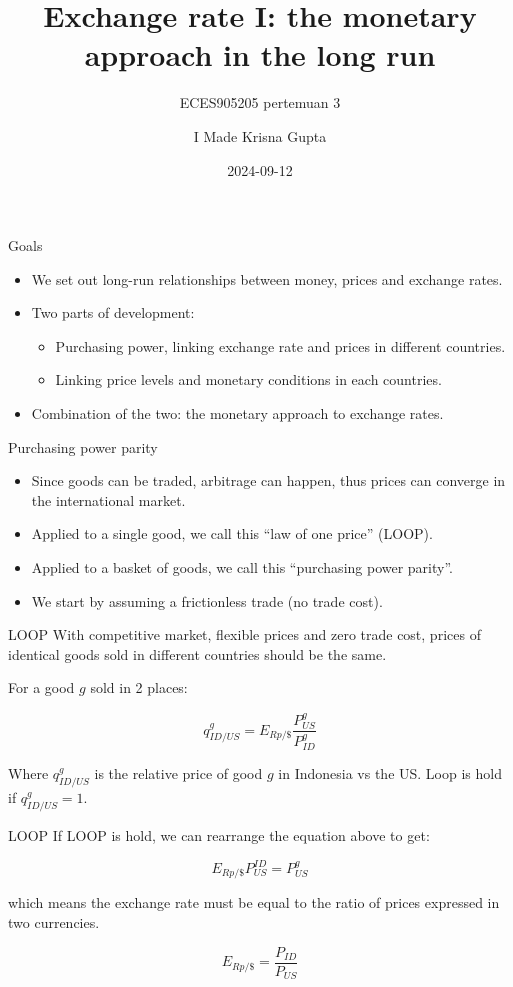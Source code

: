 \documentclass[
  ignorenonframetext,
]{beamer}
\title{Exchange rate I: the monetary approach in the long run}
\subtitle{ECES905205 pertemuan 3}
\author{I Made Krisna Gupta}
\date{2024-09-12}
\begin{document}
\frame{\titlepage}


\begin{frame}{Goals}
\label{goals}
\begin{itemize}
\item
  We set out long-run relationships between money, prices and exchange
  rates.
\item
  Two parts of development:

  \begin{itemize}
  \item
    Purchasing power, linking exchange rate and prices in different
    countries.
  \item
    Linking price levels and monetary conditions in each countries.
  \end{itemize}
\item
  Combination of the two: the monetary approach to exchange rates.
\end{itemize}
\end{frame}

\begin{frame}{Purchasing power parity}
\label{purchasing-power-parity}
\begin{itemize}
\item
  Since goods can be traded, arbitrage can happen, thus prices can
  converge in the international market.
\item
  Applied to a single good, we call this ``law of one price'' (LOOP).
\item
  Applied to a basket of goods, we call this ``purchasing power
  parity''.
\item
  We start by assuming a frictionless trade (no trade cost).
\end{itemize}
\end{frame}

\begin{frame}{LOOP}
\label{loop}
With competitive market, flexible prices and zero trade cost, prices of
identical goods sold in different countries should be the same.

For a good \(g\) sold in 2 places:

\[
q^g_{ID/US}=E_{Rp/\$}\frac{P^g_{US}}{P^g_{ID}}
\]

Where \(q^g_{ID/US}\) is the relative price of good \(g\) in Indonesia
vs the US. Loop is hold if \(q^g_{ID/US}=1\).
\end{frame}

\begin{frame}{LOOP}
\label{loop-1}
If LOOP is hold, we can rearrange the equation above to get:

\[
E_{Rp/\$}P_{US}^{ID}=P^g_{US}
\]

which means the exchange rate must be equal to the ratio of prices
expressed in two currencies.

\[
E_{Rp/\$}=\frac{P_{ID}}{P_{US}}
\]
\end{frame}
\end{document}

